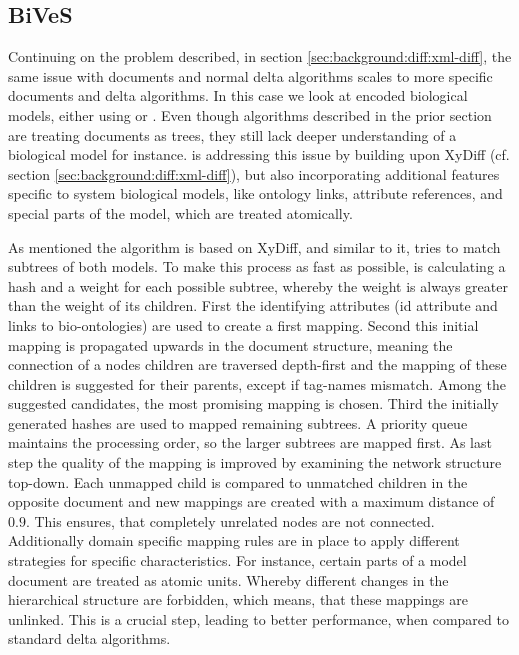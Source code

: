	\subsection{BiVeS}
	Continuing on the problem described, in section \ref{sec:background:diff:xml-diff}, the same issue with \xml documents and normal delta algorithms scales to more specific documents and \xml delta algorithms. In this case we look at \xml encoded biological models, either using \cellml or \sbml. Even though algorithms described in the prior section are treating \xml documents as trees, they still lack deeper understanding of a biological model for instance. \bives is addressing this issue by building upon XyDiff (cf. section \ref{sec:background:diff:xml-diff}), but also incorporating additional features specific to system biological models, like ontology links, attribute references, and special parts of the model, which are treated atomically. \cite{Scharm2015}
	
	As mentioned the \bives algorithm is based on XyDiff, and similar to it, \bives tries to match subtrees of both models. To make this process as fast as possible, \bives is calculating a hash and a weight for each possible subtree, whereby the weight is always greater than the weight of its children.
	First the identifying attributes (\xml id attribute and links to bio-ontologies) are used to create a first mapping. Second this initial mapping is propagated upwards in the document structure, meaning the connection of a nodes children are traversed depth-first and the mapping of these children is suggested for their parents, except if tag-names mismatch. Among the suggested candidates, the most promising mapping is chosen.
	Third the initially generated hashes are used to mapped remaining subtrees. A priority queue maintains the processing order, so the larger subtrees are mapped first.
	As last step the quality of the mapping is improved by examining the network structure top-down. Each unmapped child is compared to unmatched children in the opposite document and new mappings are created with a maximum distance of $0.9$. This ensures, that completely unrelated nodes are not connected.
	Additionally domain specific mapping rules are in place to apply different strategies for specific characteristics. For instance, certain parts of a model document are treated as atomic units. Whereby different changes in the hierarchical structure are forbidden, which means, that these mappings are unlinked. This is a crucial step, leading to better performance, when compared to standard \xml delta algorithms.
	
